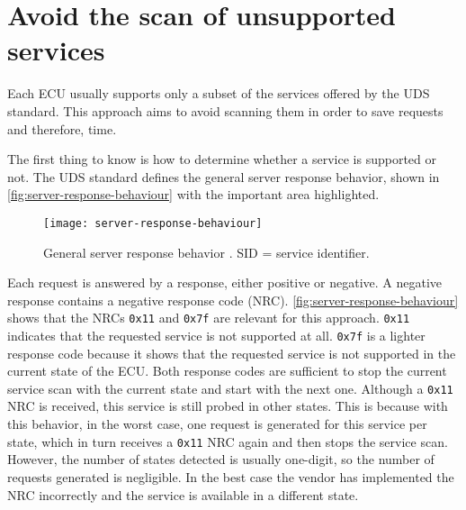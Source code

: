 \section{Avoid the scan of unsupported services}
\label{subsec:unsupported-services-elaboration}

Each ECU usually supports only a subset of the services offered by the UDS standard. This approach aims to avoid scanning them in order to save requests and therefore, time.

The first thing to know is how to determine whether a service is supported or not. The UDS standard defines the general server response behavior, shown in \autoref{fig:server-response-behaviour} with the important area highlighted.

\begin{figure}[htb]
    \centering
    \texttt{[image: server-response-behaviour]}
    \caption{General server response behavior \cite{iso14229}. SID = service identifier.}
    \label{fig:server-response-behaviour}
\end{figure}

Each request is answered by a response, either positive or negative. A negative response contains a negative response code (NRC). \autoref{fig:server-response-behaviour} shows that the NRCs \texttt{0x11} and \texttt{0x7f} are relevant for this approach. \texttt{0x11} indicates that the requested service is not supported at all. \texttt{0x7f} is a lighter response code because it shows that the requested service is not supported in the current state of the ECU. Both response codes are sufficient to stop the current service scan with the current state and start with the next one. Although a \texttt{0x11} NRC is received, this service is still probed in other states. This is because with this behavior, in the worst case, one request is generated for this service per state, which in turn receives a \texttt{0x11} NRC again and then stops the service scan. However, the number of states detected is usually one-digit, so the number of requests generated is negligible. In the best case the vendor has implemented the NRC incorrectly and the service is available in a different state.
